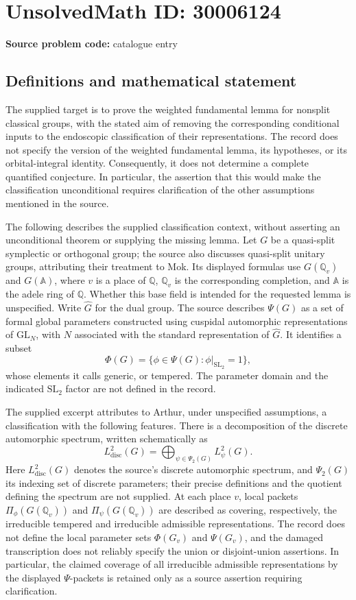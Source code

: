 \documentclass[11pt]{article}
\newcommand{\Q}{\mathbb{Q}}
\newcommand{\A}{\mathbb{A}}
\begin{document}
\section*{UnsolvedMath ID: 30006124}
\textbf{Source problem code:} catalogue entry
\subsection{Definitions and mathematical statement}
The supplied target is to prove the weighted fundamental lemma for nonsplit classical groups, with the stated aim of removing the corresponding conditional inputs to the endoscopic classification of their representations. The record does not specify the version of the weighted fundamental lemma, its hypotheses, or its orbital-integral identity. Consequently, it does not determine a complete quantified conjecture. In particular, the assertion that this would make the classification unconditional requires clarification of the other assumptions mentioned in the source.

The following describes the supplied classification context, without asserting an unconditional theorem or supplying the missing lemma. Let \(G\) be a quasi-split symplectic or orthogonal group; the source also discusses quasi-split unitary groups, attributing their treatment to Mok. Its displayed formulas use \(G(\Q_v)\) and \(G(\A)\), where \(v\) is a place of \(\Q\), \(\Q_v\) is the corresponding completion, and \(\A\) is the adele ring of \(\Q\). Whether this base field is intended for the requested lemma is unspecified. Write \(\widehat G\) for the dual group. The source describes \(\Psi(G)\) as a set of formal global parameters constructed using cuspidal automorphic representations of \(\mathrm{GL}_N\), with \(N\) associated with the standard representation of \(\widehat G\). It identifies a subset
\[
\Phi(G)=\{\phi\in\Psi(G):\phi|_{\mathrm{SL}_2}=1\},
\]
whose elements it calls generic, or tempered. The parameter domain and the indicated \(\mathrm{SL}_2\) factor are not defined in the record.

The supplied excerpt attributes to Arthur, under unspecified assumptions, a classification with the following features. There is a decomposition of the discrete automorphic spectrum, written schematically as
\[
L^2_{\mathrm{disc}}(G)=\bigoplus_{\psi\in\Psi_2(G)}L^2_\psi(G).
\]
Here \(L^2_{\mathrm{disc}}(G)\) denotes the source's discrete automorphic spectrum, and \(\Psi_2(G)\) its indexing set of discrete parameters; their precise definitions and the quotient defining the spectrum are not supplied. At each place \(v\), local packets \(\Pi_\phi(G(\Q_v))\) and \(\Pi_\psi(G(\Q_v))\) are described as covering, respectively, the irreducible tempered and irreducible admissible representations. The record does not define the local parameter sets \(\Phi(G_v)\) and \(\Psi(G_v)\), and the damaged transcription does not reliably specify the union or disjoint-union assertions. In particular, the claimed coverage of all irreducible admissible representations by the displayed \(\Psi\)-packets is retained only as a source assertion requiring clarification.
\end{document}
